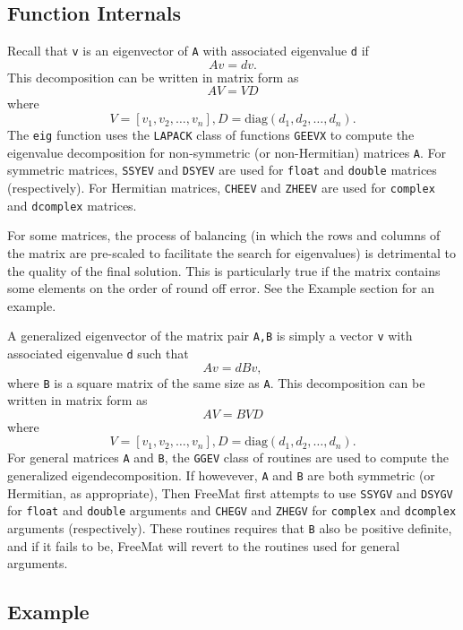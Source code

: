 \subsection{Function Internals}

Recall that \verb|v| is an eigenvector of \verb|A| with associated eigenvalue
\verb|d| if
\[
  A v = d v.
\]
This decomposition can be written in matrix form as
\[
  A V = V D
\]
where
\[
  V = [v_1,v_2,\ldots,v_n], D = \mathrm{diag}(d_1,d_2,\ldots,d_n).
\]
The \verb|eig| function uses the \verb|LAPACK| class of functions \verb|GEEVX|
to compute the eigenvalue decomposition for non-symmetric 
(or non-Hermitian) matrices \verb|A|.  For symmetric matrices, \verb|SSYEV|
 and \verb|DSYEV| are used for \verb|float| and \verb|double| matrices (respectively).
For Hermitian matrices, \verb|CHEEV| and \verb|ZHEEV| are used for \verb|complex|
and \verb|dcomplex| matrices.

For some matrices, the process of balancing (in which the rows and
columns of the matrix are pre-scaled to facilitate the search for
eigenvalues) is detrimental to the quality of the final solution.
This is particularly true if the matrix contains some elements on
the order of round off error.  See the Example section for an example.

A generalized eigenvector of the matrix pair \verb|A,B| is simply a 
vector \verb|v| with associated eigenvalue \verb|d| such that
\[
  A v = d B v,
\]
where \verb|B| is a square matrix of the same size as \verb|A|.  This
decomposition can be written in matrix form as 
\[
  A V = B V D
\]
where
\[
  V = [v_1,v_2,\ldots,v_n], D = \mathrm{diag}(d_1,d_2,\ldots,d_n).
\]
For general matrices \verb|A| and \verb|B|, the \verb|GGEV| class of routines are
used to compute the generalized eigendecomposition.  If howevever,
\verb|A| and \verb|B| are both symmetric (or Hermitian, as appropriate),
Then FreeMat first attempts to use \verb|SSYGV| and \verb|DSYGV| for \verb|float|
and \verb|double| arguments and \verb|CHEGV| and \verb|ZHEGV| for \verb|complex|
and \verb|dcomplex| arguments (respectively).  These routines requires
that \verb|B| also be positive definite, and if it fails to be, FreeMat
will revert to the routines used for general arguments.
\subsection{Example}

